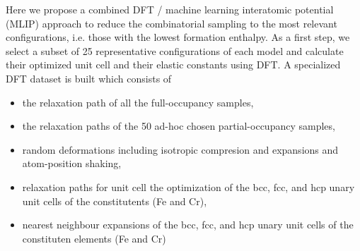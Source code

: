 \documentclass[superscriptaddress, 12pt]{revtex4-2}%
\begin{document}
Here we propose a combined DFT / machine learning interatomic potential (MLIP) approach to reduce the combinatorial sampling to the most relevant configurations, i.e. those with the lowest formation enthalpy.
As a first step, we select a subset of 25 representative configurations of each model and calculate their optimized unit cell and their elastic constants using DFT. 
A specialized DFT dataset is built which consists of 
\begin{itemize}
	\item the relaxation path of all the full-occupancy samples,
	\item the relaxation paths of the 50 ad-hoc chosen partial-occupancy samples,
	\item random deformations including isotropic compresion and expansions and atom-position shaking, 
	\item relaxation paths for unit cell the optimization of the bcc, fcc, and hcp unary unit cells of the constitutents (Fe and Cr), 
	\item nearest neighbour expansions of the bcc, fcc, and hcp unary unit cells of the constituten elements (Fe and Cr)
\end{itemize}
\end{document}
